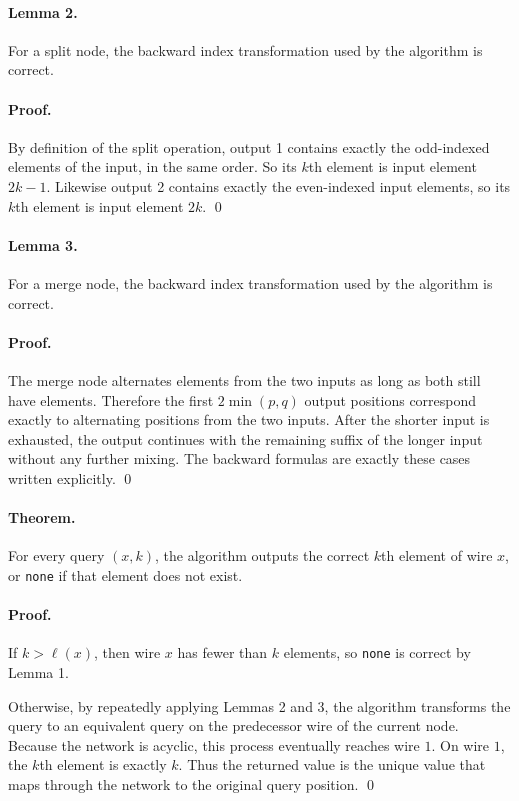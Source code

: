 \documentclass[11pt]{article}
\begin{document}
\paragraph{Lemma 2.}
For a split node, the backward index transformation used by the algorithm is correct.

\paragraph{Proof.}
By definition of the split operation, output 1 contains exactly the odd-indexed elements of the input, in
the same order. So its $k$th element is input element $2k-1$. Likewise output 2 contains exactly the
even-indexed input elements, so its $k$th element is input element $2k$. \qed

\paragraph{Lemma 3.}
For a merge node, the backward index transformation used by the algorithm is correct.

\paragraph{Proof.}
The merge node alternates elements from the two inputs as long as both still have elements. Therefore the
first $2\min(p,q)$ output positions correspond exactly to alternating positions from the two inputs. After
the shorter input is exhausted, the output continues with the remaining suffix of the longer input without
any further mixing. The backward formulas are exactly these cases written explicitly. \qed

\paragraph{Theorem.}
For every query $(x,k)$, the algorithm outputs the correct $k$th element of wire $x$, or \texttt{none} if
that element does not exist.

\paragraph{Proof.}
If $k > \ell(x)$, then wire $x$ has fewer than $k$ elements, so \texttt{none} is correct by Lemma 1.

Otherwise, by repeatedly applying Lemmas 2 and 3, the algorithm transforms the query to an equivalent
query on the predecessor wire of the current node. Because the network is acyclic, this process
eventually reaches wire $1$. On wire $1$, the $k$th element is exactly $k$. Thus the returned value is
the unique value that maps through the network to the original query position. \qed
\end{document}
